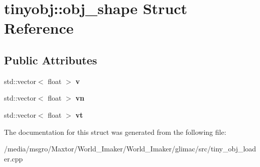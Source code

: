 \hypertarget{structtinyobj_1_1obj__shape}{}\section{tinyobj\+:\+:obj\+\_\+shape Struct Reference}
\label{structtinyobj_1_1obj__shape}
\subsection*{Public Attributes}
\begin{DoxyCompactItemize}
\item 
\mbox{\label{structtinyobj_1_1obj__shape_ad088c2525809a91953fca51798f64b89}} 
std\+::vector$<$ float $>$ {\bfseries v}
\item 
\mbox{\label{structtinyobj_1_1obj__shape_ac87ced8cdff16da62a202bd390e77a8e}} 
std\+::vector$<$ float $>$ {\bfseries vn}
\item 
\mbox{\label{structtinyobj_1_1obj__shape_a2d6dcc97e66ca2596dd50236c899b456}} 
std\+::vector$<$ float $>$ {\bfseries vt}
\end{DoxyCompactItemize}


The documentation for this struct was generated from the following file\+:\begin{DoxyCompactItemize}
\item 
/media/msgro/\+Maxtor/\+World\+\_\+\+Imaker/\+World\+\_\+\+Imaker/glimac/src/tiny\+\_\+obj\+\_\+loader.\+cpp\end{DoxyCompactItemize}
